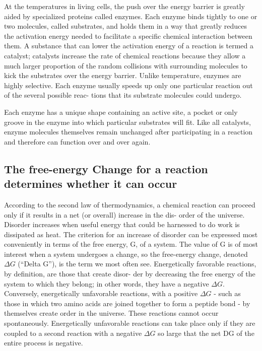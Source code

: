 At the temperatures in living cells, the push over the energy barrier is
greatly aided by specialized proteins called enzymes. Each enzyme binds
tightly to one or two molecules, called substrates, and holds them in
a way that greatly reduces the activation energy needed to facilitate a
specific chemical interaction between them. A substance
that can lower the activation energy of a reaction is termed a catalyst;
catalysts increase the rate of chemical reactions because they allow a
much larger proportion of the random collisions with surrounding molecules
to kick the substrates over the energy barrier.
Unlike temperature, enzymes are highly selective. Each enzyme usually
speeds up only one particular reaction out of the several possible reac-
tions that its substrate molecules could undergo.

Each enzyme has a unique shape containing an active site, a pocket or only
groove in the enzyme into which particular substrates will fit.
Like all catalysts, enzyme molecules themselves remain unchanged
after participating in a reaction and therefore can function over and over
again.

\subsection{The free-energy Change for a reaction determines whether it can occur}

According to the second law of thermodynamics, a chemical reaction
can proceed only if it results in a net (or overall) increase in the dis-
order of the universe. Disorder increases when useful
energy that could be harnessed to do work is dissipated as heat. The
criterion for an increase of disorder can be expressed most conveniently
in terms of the free energy, G, of a system. The value of G is of most
interest when a system undergoes a change, so the free-energy change,
denoted $\Delta G$ (“Delta G”), is the term we most often see.
Energetically favorable reactions, by definition, are those that create disor-
der by decreasing the free energy of the system to which they belong; in
other words, they have a negative $\Delta G$. Conversely, energetically unfavorable reactions, with a positive
$\Delta G$ - such as those in which two amino acids are joined together to form
a peptide bond - by themselves create order in the universe. These reactions
cannot occur spontaneously. Energetically unfavorable reactions
can take place only if they are coupled to a second reaction with a negative
$\Delta G$ so large that the net DG of the entire process is negative.


